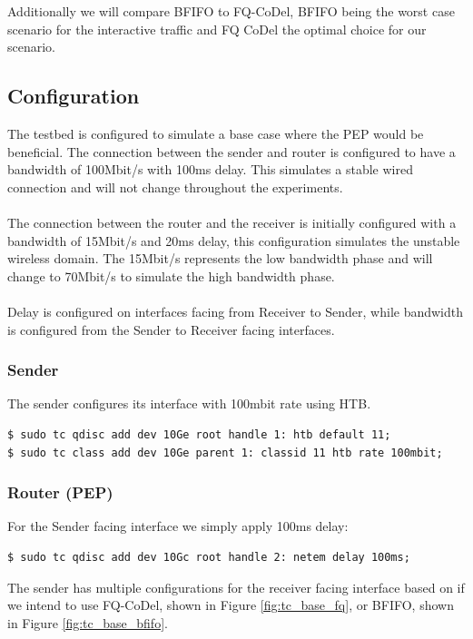 \documentclass[a4paper,english, 11pt]{report}
\begin{document}
Additionally we will compare BFIFO to FQ-CoDel, BFIFO being the worst case scenario for the interactive traffic and FQ CoDel the optimal choice for our scenario.

\subsection{Configuration}
The testbed is configured to simulate a base case where the PEP would be beneficial.
The connection between the sender and router is configured to have a bandwidth of 100Mbit/s with 100ms delay. This simulates a stable wired connection and will not change throughout the experiments.\\\\
The connection between the router and the receiver is initially configured with a bandwidth of 15Mbit/s and 20ms delay, this configuration simulates the unstable wireless domain. The 15Mbit/s represents the low bandwidth phase and will change to 70Mbit/s to simulate the high bandwidth phase.\\\\
Delay is configured on interfaces facing from Receiver to Sender, while bandwidth is configured from the Sender to Receiver facing interfaces. 

\subsubsection{Sender}
The sender configures its interface with 100mbit rate using HTB.
\begin{verbatim}
$ sudo tc qdisc add dev 10Ge root handle 1: htb default 11;
$ sudo tc class add dev 10Ge parent 1: classid 11 htb rate 100mbit;
\end{verbatim}

\subsubsection{Router (PEP)}
For the Sender facing interface we simply apply 100ms delay:
\begin{verbatim}
$ sudo tc qdisc add dev 10Gc root handle 2: netem delay 100ms;
\end{verbatim}

The sender has multiple configurations for the receiver facing interface based on if we intend to use FQ-CoDel, shown in Figure \ref{fig:tc_base_fq}, or BFIFO, shown in Figure \ref{fig:tc_base_bfifo}.\\
\end{document}
